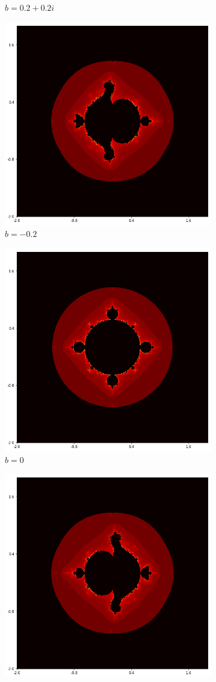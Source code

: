 \documentclass{amsart}
\theoremstyle{definition}
\theoremstyle{remark}
\numberwithin{equation}{section}
\begin{document}
\begin{figure}[h]
\begin{subfigure}{.32\textwidth}
  \caption{$b=0.2+0.2i$}
\end{subfigure}
\begin{subfigure}{.32\textwidth}
  \centering
  \includegraphics[width=.7\linewidth]{ShiftLocus3b4.png}
  \caption{$b=-0.2$}
\end{subfigure}
\begin{subfigure}{.32\textwidth}
  \centering
  \includegraphics[width=.7\linewidth]{ShiftLocus3b5.png}
  \caption{$b=0$}
\end{subfigure}%
\begin{subfigure}{.32\textwidth}
  \centering
  \includegraphics[width=.7\linewidth]{ShiftLocus3b6.png}

\end{subfigure}
\end{figure}
\end{document}
